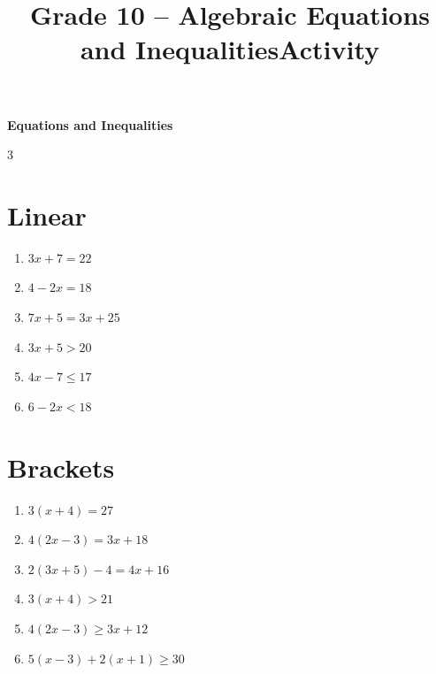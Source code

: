 \makeatletter
{}
\makeatother



\title{Grade 10 -- Algebraic Equations and Inequalities\Practice Activity}
\author{}
\date{}

\pagestyle{empty}


	\begin{center}
		\huge \textbf{Equations and Inequalities}
	\end{center}
	
	\begin{multicols}{3}
		
		\section{Linear}
		
		\begin{enumerate}
			\item $3x+7=22$
			
			\item $4-2x=18$
			
			\item $7x+5=3x+25$
			
			\item $3x+5>20$
			
			\item $4x-7\leq17$
			
			\item $6-2x<18$
		\end{enumerate}
		
		\section{Brackets}
		
		\begin{enumerate}
			\item $3(x+4)=27$
			
			\item $4(2x-3)=3x+18$
			
			\item $2(3x+5)-4=4x+16$
			
			\item $3(x+4)>21$
			
			\item $4(2x-3)\geq3x+12$
			
			\item $5(x-3)+2(x+1)\geq30$
		\end{enumerate}
		

\end{multicols}
